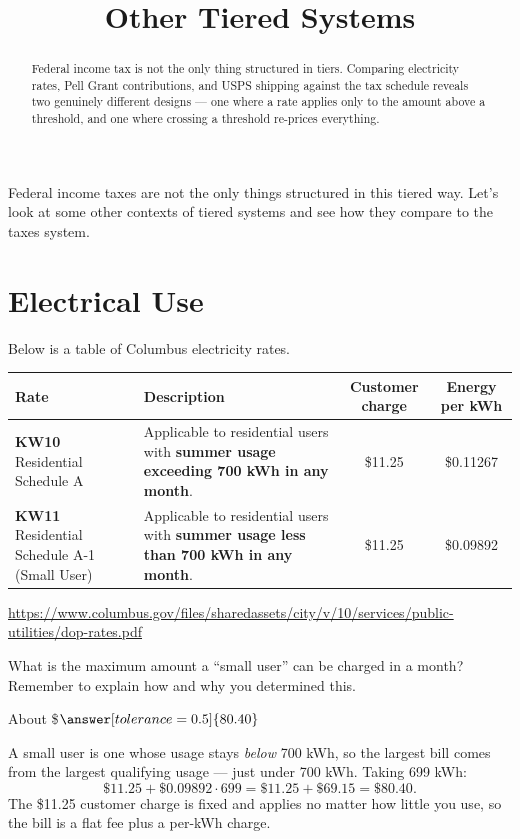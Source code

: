 \documentclass[12pt]{ximera}
\title{Other Tiered Systems}
\begin{document}
\begin{abstract}
Federal income tax is not the only thing structured in tiers. Comparing electricity
rates, Pell Grant contributions, and USPS shipping against the tax schedule reveals two
genuinely different designs --- one where a rate applies only to the amount above a
threshold, and one where crossing a threshold re-prices everything.
\end{abstract}
\maketitle

Federal income taxes are not the only things structured in this tiered way. Let's look
at some other contexts of tiered systems and see how they compare to the taxes system.

\section*{Electrical Use}

Below is a table of Columbus electricity rates.


\begin{center}
\begin{tabular}{|l|p{5.6cm}|c|c|}
\hline
\textbf{Rate} & \textbf{Description} & \textbf{Customer charge} & \textbf{Energy per kWh} \\
\hline
\textbf{KW10} Residential Schedule A
& Applicable to residential users with \textbf{summer usage exceeding 700 kWh in any
month}.
& \$11.25 & \$0.11267 \\
\hline
\textbf{KW11} Residential Schedule A-1 (Small User)
& Applicable to residential users with \textbf{summer usage less than 700 kWh in any
month}.
& \$11.25 & \$0.09892 \\
\hline
\end{tabular}
\end{center}

{\footnotesize\url{https://www.columbus.gov/files/sharedassets/city/v/10/services/public-utilities/dop-rates.pdf}}

\begin{problem}
What is the maximum amount a ``small user'' can be charged in a month? Remember to
explain how and why you determined this.

About \$$\answer[tolerance=0.5]{80.40}$

\begin{freeResponse}
\end{freeResponse}

\begin{solution}
A small user is one whose usage stays \emph{below} 700 kWh, so the largest bill comes
from the largest qualifying usage --- just under 700 kWh. Taking 699 kWh:
\[
\$11.25 + \$0.09892 \cdot 699 = \$11.25 + \$69.15 = \$80.40.
\]
The \$11.25 customer charge is fixed and applies no matter how little you use, so the
bill is a flat fee plus a per-kWh charge.
\end{solution}
\end{problem}
\end{document}
